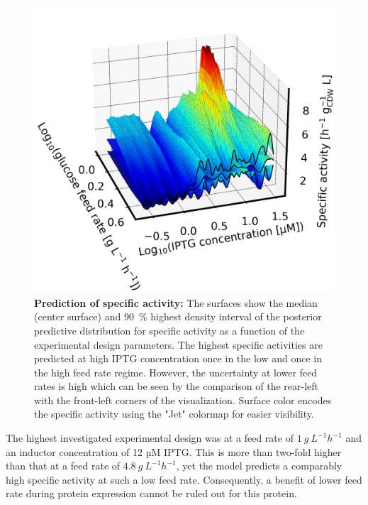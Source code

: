 \documentclass[sn-standardnature]{sn-jnl}%
\theoremstyle{thmstyleone}%
\theoremstyle{thmstyletwo}%
\theoremstyle{thmstylethree}%
\begin{document}
\begin{figure}[H]
    \centering
    \includegraphics[width=1.0\textwidth]{figures/plot_3d_pp_dense_s_design.png}
    \caption{
        \textbf{Prediction of specific activity:}
        The surfaces show the median (center surface) and 90~\% highest density interval of the posterior predictive distribution for specific activity as a function of the experimental design parameters.
        The highest specific activities are predicted at high IPTG concentration once in the low and once in the high feed rate regime.
        However, the uncertainty at lower feed rates is high which can be seen by the comparison of the rear-left with the front-left corners of the visualization.
        Surface color encodes the specific activity using the "Jet" colormap \cite{matplotlibDocs} for easier visibility.
    }
    \label{fig_3Dsdesign}
\end{figure}


The highest investigated experimental design was at a feed rate of $1\ g\ L^{-1} h^{-1}$ and an inductor concentration of 12 µM IPTG.
This is more than two-fold higher than that at a feed rate of $4.8\ g\ L^{-1} h^{-1}$, yet the model predicts a comparably high specific activity at such a low feed rate.
Consequently, a benefit of lower feed rate during protein expression cannot be ruled out for this protein.
\end{document}
